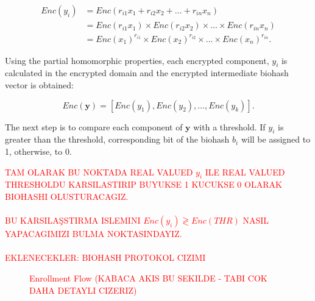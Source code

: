 \documentclass[conference]{IEEEtran}
\begin{document}
\begin{align}
Enc(y_i) &= Enc(r_{i1}x_1 + r_{i2}x_2 + \ldots + r_{in}x_n)\\
&= Enc(r_{i1}x_1)\times Enc(r_{i2}x_2)\times\ldots\times Enc(r_{in}x_n)\\
&=Enc(x_1)^{r_{i1}}\times Enc(x_2)^{r_{i2}}\times\ldots\times Enc(x_n)^{r_{in}}.
\label{eqn7}
\end{align}

Using the partial homomorphic properties, each encrypted component, $y_i$ is calculated in the encrypted domain and the encrypted intermediate biohash vector is obtained:

\begin{equation}
Enc(\mathbf{y}) = [Enc(y_1), Enc(y_2), \ldots, Enc(y_k)].
\label{eqn8}
\end{equation}

The next step is to compare each component of $\mathbf{y}$ with a threshold. If $y_i$ is greater than the threshold, corresponding bit of the biohash $b_i$ will be assigned to 1, otherwise, to 0.

\textcolor{red}{TAM OLARAK BU NOKTADA REAL VALUED $y_i$ ILE REAL VALUED THRESHOLDU KARSILASTIRIP BUYUKSE 1 KUCUKSE 0 OLARAK BIOHASHI OLUSTURACAGIZ.\\\\
BU KARSILAŞSTIRMA ISLEMINI $Enc(y_i) \gtrless Enc(THR)$ NASIL YAPACAGIMIZI BULMA NOKTASINDAYIZ.\\\\
EKLENECEKLER: BIOHASH PROTOKOL CIZIMI}

\begin{figure}
\caption{\textcolor{red}{Enrollment Flow (KABACA AKIS BU SEKILDE - TABI COK DAHA DETAYLI CIZERIZ)}}
\end{figure}
\end{document}
